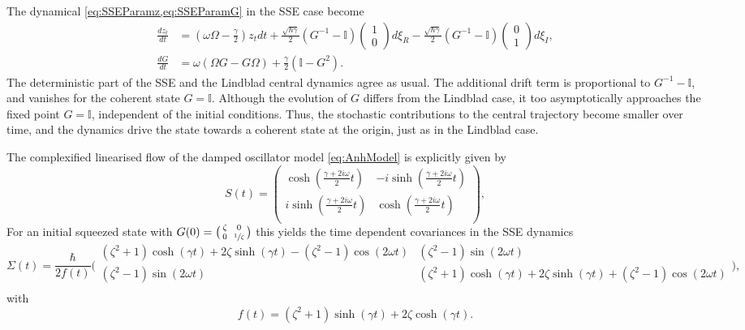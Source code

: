 \documentclass[12pt]{iopart} %
\begin{document}
The dynamical \cref{eq:SSEParamz,eq:SSEParamG} in the SSE case become
\begin{equation} 
    \begin{aligned} \label{eq:SSEAnh}
    \frac{d  z_t}{d t} &= (\omega\Omega -\frac{\gamma}{2 }) z_t dt +\frac{\sqrt{\hbar \gamma}}{2}(G^{-1}-\mathbb{I})\begin{pmatrix}1 \\ 0\end{pmatrix}d\xi_R-\frac{\sqrt{\hbar \gamma}}{2}(G^{-1}-\mathbb{I})\begin{pmatrix}0 \\ 1\end{pmatrix}d\xi_I,\\
  	\frac{dG}{dt} &=\omega(\Omega G-G\Omega) +\frac{\gamma}{2 }( \mathbb{I} - G^2).
    \end{aligned}
\end{equation}
The deterministic part of the SSE and the Lindblad central dynamics agree as usual. The additional drift term is proportional to $G^{-1}-\mathbb{I}$, and vanishes for the coherent state $G=\mathbb{I}$. Although the evolution of $G$ differs from the Lindblad case, it too asymptotically approaches the fixed point $G=\mathbb{I}$, independent of the initial conditions. Thus, the stochastic contributions to the central trajectory become smaller over time, and the dynamics drive the state towards a coherent state at the origin, just as in the Lindblad case. 

The complexified linearised flow of the damped oscillator model \cref{eq:AnhModel} is explicitly given by
\begin{equation} \label{eq:SAnh}
    S(t)=\begin{pmatrix}
    \cosh \left(\frac{\gamma +2 i  \omega}{2 }t \right) & -i \sinh \left(\frac{\gamma +2 i  \omega}{2 }t \right) \\
 i \sinh \left(\frac{\gamma +2 i  \omega}{2}t \right) & \cosh \left(\frac{\gamma +2 i  \omega}{2}t \right) \\
    \end{pmatrix},
\end{equation}
For an initial squeezed state with $G(0)=\big(\begin{smallmatrix}\zeta&&0\\0&&\sfrac{1}{\zeta}\end{smallmatrix} \big)$ 
this yields the time dependent covariances in the SSE dynamics
\begin{equation}
    \Sigma(t)=\frac{\hbar}{2 f(t)}
\bigg(\begin{smallmatrix}
 (\zeta ^2+1) \cosh (\gamma  t)+2 \zeta  \sinh (\gamma  t)-(\zeta ^2-1) \cos (2  \omega t
   ) & (\zeta ^2-1) \sin (2 
   \omega t) \\
 (\zeta ^2-1) \sin (2  \omega t) &
   (\zeta ^2+1) \cosh (\gamma  t)+2 \zeta  \sinh (\gamma  t)+(\zeta ^2-1) \cos (2 \omega t
   ) \\
\end{smallmatrix}\bigg),
\end{equation}
with 
\begin{equation}
    f(t)=\left(\zeta ^2+1\right) \sinh (\gamma  t)+2 \zeta  \cosh (\gamma  t).
\end{equation}
\end{document}

